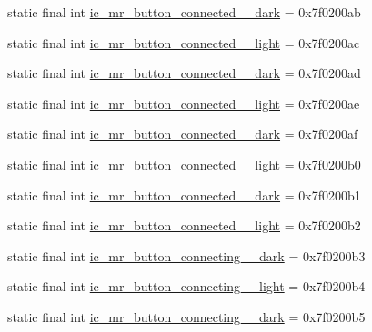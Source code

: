 \begin{CompactItemize}
\item 
static final int \hyperlink{classandroid_1_1support_1_1graphics_1_1drawable_1_1animated_1_1_r_1_1drawable_6e0f2c960404f5187498d416622dca32}{ic\_\-mr\_\-button\_\-connected\_\_\-dark} = 0x7f0200ab
\item 
static final int \hyperlink{classandroid_1_1support_1_1graphics_1_1drawable_1_1animated_1_1_r_1_1drawable_3ade5006d84450ca2023caa2b56a8854}{ic\_\-mr\_\-button\_\-connected\_\_\-light} = 0x7f0200ac
\item 
static final int \hyperlink{classandroid_1_1support_1_1graphics_1_1drawable_1_1animated_1_1_r_1_1drawable_6e599751e6b0749775b5fb24557b12ab}{ic\_\-mr\_\-button\_\-connected\_\_\-dark} = 0x7f0200ad
\item 
static final int \hyperlink{classandroid_1_1support_1_1graphics_1_1drawable_1_1animated_1_1_r_1_1drawable_e47676a4c1c474a2b40e26dbb9c2665f}{ic\_\-mr\_\-button\_\-connected\_\_\-light} = 0x7f0200ae
\item 
static final int \hyperlink{classandroid_1_1support_1_1graphics_1_1drawable_1_1animated_1_1_r_1_1drawable_8d02860ee1bca17126a8a733641f2f1e}{ic\_\-mr\_\-button\_\-connected\_\_\-dark} = 0x7f0200af
\item 
static final int \hyperlink{classandroid_1_1support_1_1graphics_1_1drawable_1_1animated_1_1_r_1_1drawable_42a5ed4910a54824c00f01807413fc57}{ic\_\-mr\_\-button\_\-connected\_\_\-light} = 0x7f0200b0
\item 
static final int \hyperlink{classandroid_1_1support_1_1graphics_1_1drawable_1_1animated_1_1_r_1_1drawable_85e28256db16d110f3b98b373ce7ec36}{ic\_\-mr\_\-button\_\-connected\_\_\-dark} = 0x7f0200b1
\item 
static final int \hyperlink{classandroid_1_1support_1_1graphics_1_1drawable_1_1animated_1_1_r_1_1drawable_8013497133f777f7c5b6b70c20b3a749}{ic\_\-mr\_\-button\_\-connected\_\_\-light} = 0x7f0200b2
\item 
static final int \hyperlink{classandroid_1_1support_1_1graphics_1_1drawable_1_1animated_1_1_r_1_1drawable_3b8aee0cf0ca4c14e0a0399513b19d8d}{ic\_\-mr\_\-button\_\-connecting\_\_\-dark} = 0x7f0200b3
\item 
static final int \hyperlink{classandroid_1_1support_1_1graphics_1_1drawable_1_1animated_1_1_r_1_1drawable_8bb991e07ad01c8f5b425537c1154063}{ic\_\-mr\_\-button\_\-connecting\_\_\-light} = 0x7f0200b4
\item 
static final int \hyperlink{classandroid_1_1support_1_1graphics_1_1drawable_1_1animated_1_1_r_1_1drawable_4d578a36fb901ac2e52d248a90c60642}{ic\_\-mr\_\-button\_\-connecting\_\_\-dark} = 0x7f0200b5

\end{CompactItemize}
